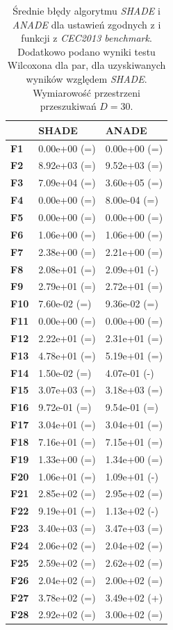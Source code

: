 \documentclass[12pt,a4paper]{report}
\begin{document}
{{{{{{\begin{table}[]
\centering
\caption{Średnie błędy algorytmu \emph{SHADE} i \emph{ANADE} dla ustawień zgodnych z \cite{SHADE} i funkcji z \emph{CEC2013 benchmark}. Dodatkowo podano wyniki testu Wilcoxona dla par, dla uzyskiwanych wyników względem \emph{SHADE}. Wymiarowość przestrzeni przeszukiwań $D = 30$.}
\label{Eksp5}
\begin{tabular}{|l|l|l|}
\hline
          & {\bf SHADE}  & {\bf ANADE}  \\ \hline
{\bf F1}  & 0.00e+00 (=) & 0.00e+00 (=) \\ \hline
{\bf F2}  & 8.92e+03 (=) & 9.52e+03 (=) \\ \hline
{\bf F3}  & 7.09e+04 (=) & 3.60e+05 (=) \\ \hline
{\bf F4}  & 0.00e+00 (=) & 8.00e-04 (=) \\ \hline
{\bf F5}  & 0.00e+00 (=) & 0.00e+00 (=) \\ \hline
{\bf F6}  & 1.06e+00 (=) & 1.06e+00 (=) \\ \hline
{\bf F7}  & 2.38e+00 (=) & 2.21e+00 (=) \\ \hline
{\bf F8}  & 2.08e+01 (=) & 2.09e+01 (-) \\ \hline
{\bf F9}  & 2.79e+01 (=) & 2.72e+01 (=) \\ \hline
{\bf F10} & 7.60e-02 (=) & 9.36e-02 (=) \\ \hline
{\bf F11} & 0.00e+00 (=) & 0.00e+00 (=) \\ \hline
{\bf F12} & 2.22e+01 (=) & 2.31e+01 (=) \\ \hline
{\bf F13} & 4.78e+01 (=) & 5.19e+01 (=) \\ \hline
{\bf F14} & 1.50e-02 (=) & 4.07e-01 (-) \\ \hline
{\bf F15} & 3.07e+03 (=) & 3.18e+03 (=) \\ \hline
{\bf F16} & 9.72e-01 (=) & 9.54e-01 (=) \\ \hline
{\bf F17} & 3.04e+01 (=) & 3.04e+01 (=) \\ \hline
{\bf F18} & 7.16e+01 (=) & 7.15e+01 (=) \\ \hline
{\bf F19} & 1.33e+00 (=) & 1.34e+00 (=) \\ \hline
{\bf F20} & 1.06e+01 (=) & 1.09e+01 (-) \\ \hline
{\bf F21} & 2.85e+02 (=) & 2.95e+02 (=) \\ \hline
{\bf F22} & 9.19e+01 (=) & 1.13e+02 (-) \\ \hline
{\bf F23} & 3.40e+03 (=) & 3.47e+03 (=) \\ \hline
{\bf F24} & 2.06e+02 (=) & 2.04e+02 (=) \\ \hline
{\bf F25} & 2.59e+02 (=) & 2.62e+02 (=) \\ \hline
{\bf F26} & 2.04e+02 (=) & 2.00e+02 (=) \\ \hline
{\bf F27} & 3.78e+02 (=) & 3.49e+02 (+) \\ \hline
{\bf F28} & 2.92e+02 (=) & 3.00e+02 (=) \\ \hline
\end{tabular}
\end{table}

}}}}}}
\end{document}
